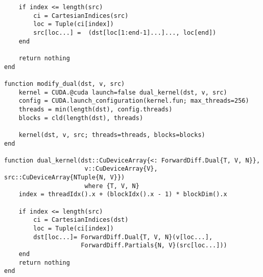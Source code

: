 \begin{lstlisting}
    if index <= length(src)
        ci = CartesianIndices(src)
        loc = Tuple(ci[index])
        src[loc...] =  (dst[loc[1:end-1]...]..., loc[end])
    end
    
    return nothing
end

function modify_dual(dst, v, src)
    kernel = CUDA.@cuda launch=false dual_kernel(dst, v, src)
    config = CUDA.launch_configuration(kernel.fun; max_threads=256)
    threads = min(length(dst), config.threads)
    blocks = cld(length(dst), threads)
    
    kernel(dst, v, src; threads=threads, blocks=blocks)
end

function dual_kernel(dst::CuDeviceArray{<: ForwardDiff.Dual{T, V, N}}, 
                      v::CuDeviceArray{V}, src::CuDeviceArray{NTuple{N, V}}) 
                      where {T, V, N}
    index = threadIdx().x + (blockIdx().x - 1) * blockDim().x
   
    if index <= length(src)
        ci = CartesianIndices(dst)
        loc = Tuple(ci[index])
        dst[loc...]= ForwardDiff.Dual{T, V, N}(v[loc...], 
                     ForwardDiff.Partials{N, V}(src[loc...]))
    end
    return nothing
end
\end{lstlisting}